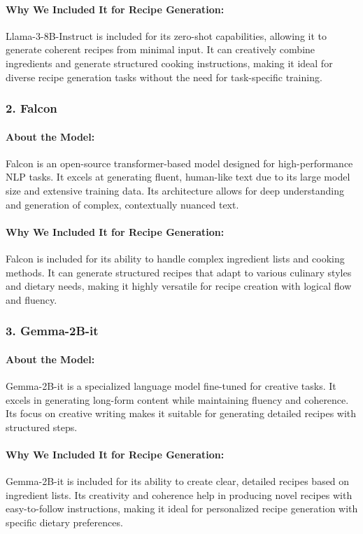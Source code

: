 \documentclass[letterpaper,11pt]{report}
\begin{document}
\paragraph{Why We Included It for Recipe Generation:}  
Llama-3-8B-Instruct is included for its zero-shot capabilities, allowing it to generate coherent recipes from minimal input. It can creatively combine ingredients and generate structured cooking instructions, making it ideal for diverse recipe generation tasks without the need for task-specific training.

\subsubsection{2. Falcon}

\paragraph{About the Model:}  
Falcon is an open-source transformer-based model designed for high-performance NLP tasks. It excels at generating fluent, human-like text due to its large model size and extensive training data. Its architecture allows for deep understanding and generation of complex, contextually nuanced text.

\paragraph{Why We Included It for Recipe Generation:}  
Falcon is included for its ability to handle complex ingredient lists and cooking methods. It can generate structured recipes that adapt to various culinary styles and dietary needs, making it highly versatile for recipe creation with logical flow and fluency.

\subsubsection{3. Gemma-2B-it}

\paragraph{About the Model:}  
Gemma-2B-it is a specialized language model fine-tuned for creative tasks. It excels in generating long-form content while maintaining fluency and coherence. Its focus on creative writing makes it suitable for generating detailed recipes with structured steps.

\paragraph{Why We Included It for Recipe Generation:}  
Gemma-2B-it is included for its ability to create clear, detailed recipes based on ingredient lists. Its creativity and coherence help in producing novel recipes with easy-to-follow instructions, making it ideal for personalized recipe generation with specific dietary preferences.
\end{document}
